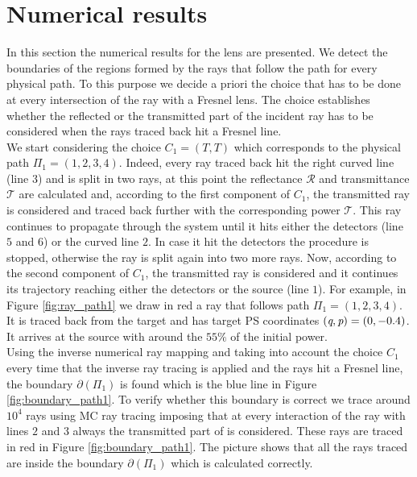 \section{Numerical results}
In this section the numerical results for the lens are presented. We detect the boundaries of the regions formed by the rays that follow the path for every physical path. To this purpose we decide a priori the choice that has to be done at every intersection of the ray with a Fresnel lens. The choice establishes whether the reflected or the transmitted part of the incident ray has to be considered when the rays traced back hit a Fresnel line.\\ \indent
We start considering the choice $C_1 = (T,T)$ which corresponds to the physical path $\Pi_1=(1,2,3,4)$.
Indeed, every ray traced back hit the right curved line (line $3$) and is split in two rays, at this point the reflectance $\mathcal{R}$ and transmittance $\mathcal{T}$ are calculated and, according to the first component of $C_1$, the transmitted ray is considered and traced back further with the corresponding power $\mathcal{T}$. This ray continues to propagate through the system until it hits either the detectors (line $5$ and $6$) or the curved line $2$.
In case it hit the detectors the procedure is stopped, otherwise the ray is split again into two more rays. Now, according to the second component of $C_1$, the transmitted ray is considered and it continues its trajectory reaching either the detectors or the source (line $1$). For example, in Figure \ref{fig:ray_path1} we draw in red a ray that follows path $\Pi_1 = (1,2,3,4)$. It is traced back from the target and has target PS coordinates $(\textit{q}, \textit{p})=(0, -0.4)$. It arrives at the source with around the $55\%$ of the initial power.\\ \indent 
Using the inverse numerical ray mapping and taking into account the choice $C_1$ every time that the inverse ray tracing is applied and the rays hit a Fresnel line, the boundary $\partial$$(\Pi_1)$ is found which is the blue line in Figure \ref{fig:boundary_path1}. To verify whether this boundary is correct we trace around $10^4$ rays using MC ray tracing imposing that at every interaction of the ray with lines $2$ and $3$ always the transmitted part of is considered. These rays are traced in red in Figure \ref{fig:boundary_path1}. The picture shows that all the rays traced are inside the boundary $\partial$$(\Pi_1)$ which is calculated correctly.
